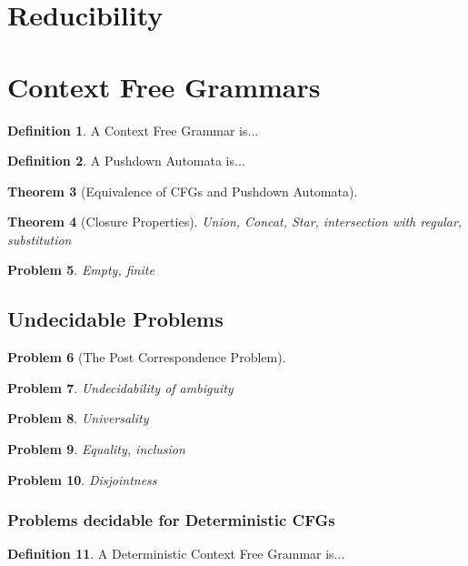\documentclass[psamsfonts]{amsart}
\newtheorem{thm}{Theorem}[section]
\newtheorem{prob}[thm]{Problem}
\theoremstyle{definition}
\newtheorem{defn}[thm]{Definition}
\theoremstyle{remark}
\numberwithin{equation}{section}
\begin{document}
\section{Reducibility}
\cite{sipser13:_introd_theor_comput}
\cite{post44:_recur}

\cite{kleene80_introd}

\section{Context Free Grammars}

\begin{defn}
 A Context Free Grammar is...
\end{defn}

\begin{defn}
  A Pushdown Automata is...
\end{defn}

\begin{thm}[Equivalence of CFGs and Pushdown Automata]
  \cite{hopcroft07:_introd_autom_theor_languag_comput}
\end{thm}
\begin{thm}[Closure Properties]
  \cite{sipser13:_introd_theor_comput}
  Union, Concat, Star, intersection with regular, substitution
\end{thm}
\begin{prob}
Empty, finite
\end{prob}
\subsection{Undecidable Problems}
\begin{prob}[The Post Correspondence Problem]
\cite{hopcroft07:_introd_autom_theor_languag_comput}
\end{prob}
\begin{prob}
 Undecidability of ambiguity 
\end{prob}
\cite{greibach66:_unsol_recog_linear_contex_free_languag}
\cite{Hopcroft1969}
\begin{prob}
  Universality
\end{prob}
\begin{prob}
  Equality, inclusion
\end{prob}
\begin{prob}
  Disjointness
\end{prob}
\subsubsection{Problems decidable for Deterministic CFGs}
\cite{ginsburg65:_deter}
\begin{defn}
  A Deterministic Context Free Grammar is...
  \cite{sipser13:_introd_theor_comput}
\end{defn}
\end{document}
